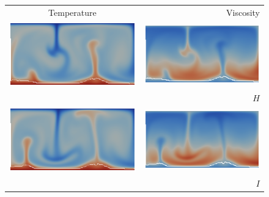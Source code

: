 \begin{figure}
  \centering
  \begin{tabular}{cr}
    Temperature & Viscosity \\
    \includegraphics[width=\twofigs]{chapters/vynnytska/png/tmH.png} &
    \includegraphics[width=\twofigs]{chapters/vynnytska/png/visH.png} \\ & $H$ \\
    \includegraphics[width=\twofigs]{chapters/vynnytska/png/tmI.png} &
    \includegraphics[width=\twofigs]{chapters/vynnytska/png/visI.png} \\ & $I$ \\

\end{tabular}
\end{figure}
